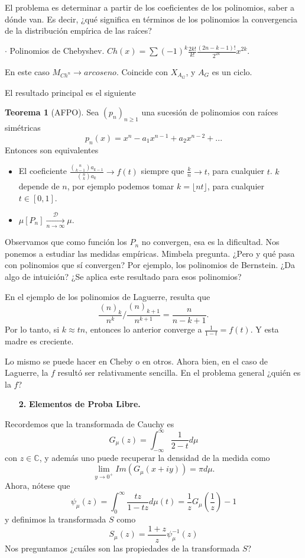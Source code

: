 \documentclass[letterpaper]{article}
\newcommand{\C}{\mathbb{C}}
\renewcommand{\to}{\rightarrow}
\newcommand{\1}{\mathds{1}}
\theoremstyle{definition}
\theoremstyle{definition}
\newtheorem{teo}{Teorema}
\theoremstyle{definition}
\theoremstyle{definition}
\theoremstyle{definition}
\begin{document}
El problema es determinar a partir de los coeficientes de los polinomios, saber a dónde van. Es decir, ¿qué significa en términos de los polinomios la convergencia de la distribución empírica de las raíces?

$\cdot$ Polinomios de Chebyshev. $Ch(x)=\sum(-1)^{k}\frac{2k!}{k!}\frac{(2n-k-1)!}{2^{2k}}x^{2k}$. 

En este caso $M_{Ch^n}\to arcoseno$. Coincide con $X_{A_G}$, y $A_G$ es un ciclo.

El resultado principal es el siguiente 
\begin{teo}[AFPO]
    Sea $(p_n)_{n\geq1}$ una sucesión de polinomios con raíces simétricas 
    \[
    p_n(x)=x^n-a_1x^{n-1}+a_2x^{n-2}+...
    \] 
    Entonces son equivalentes
    \begin{itemize}
        \item El coeficiente $\frac{{n\choose k-1}a_{k-1}}{{n\choose k}a_k}\to f(t)$ siempre que $\frac{k}{n}\to t$, para cualquier $t$. $k$ depende de $n$, por ejemplo podemos tomar $k=\lfloor nt\rfloor$, para cualquier $t\in [0,1]$.
        \item $\mu[P_n]\xrightarrow[n\to \infty]{\mathcal{D}}\mu$.
    \end{itemize}
    Observamos que como función los $P_n$ no convergen, esa es la dificultad. Nos ponemos a estudiar las medidas empíricas. Mimbela pregunta. ¿Pero y qué pasa con polinomios que sí convergen? Por ejemplo, los polinomios de Bernstein. ¿Da algo de intuición? ¿Se aplica este resultado para esos polinomios?
 \end{teo}

 En el ejemplo de los polinomios de Laguerre, resulta que 
 \[
 \frac{(n)_k}{n^{k}}/\frac{(n)_{k+1}}{n^{k+1}}=\frac{n}{n-k+1}.
 \]
 Por lo tanto, si $k\approx tn$, entonces lo anterior converge a $\frac{1}{1-t}=f(t)$. Y esta madre es creciente.

 Lo mismo se puede hacer en Cheby o en otros. Ahora bien, en el caso de Laguerre, la $f$ resultó ser relativamente sencilla. En el problema general ¿quién es la $f$?

 \begin{enumerate}
    \item[\textbf{2.}] \textbf{Elementos de Proba Libre.}
 \end{enumerate}
 Recordemos que la transformada de Cauchy es
 \[
 G_\mu(z)=\int_{-\infty}^\infty\frac{1}{2-t}d\mu
 \]
con $z\in \C$, y además uno puede recuperar la densidad de la medida como 
\[
\lim_{y\to 0^+}Im(G_\mu (x+iy))=\pi d\mu.
\]
Ahora, nótese que 
\[
\psi_{\mu}(z)=\int_{0}^{\infty}\frac{tz}{1-tz}d\mu(t)=\frac{1}{z}G_\mu(\frac{1}{z})-1
\]
y definimos la transformada $S$ como 
\[
S_\mu(z)=\frac{1+z}{z}\psi^{-1}_\mu(z)
\]
Nos preguntamos ¿cuáles son las propiedades de la transformada $S$? 
\end{document}

